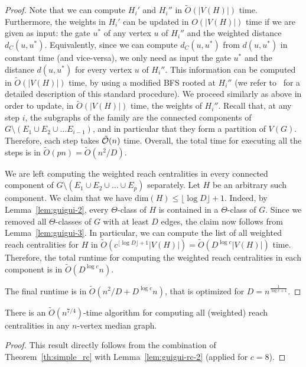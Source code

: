 \begin{proof}
Note that we can compute $H_i'$ and $H_i''$ in $\tilde{O}(|V(H)|)$ time.
Furthermore, the weights in $H_i'$ can be updated in $O(|V(H)|)$ time if we are given as input: the gate $u^*$ of any vertex $u$ of $H_i''$ and the weighted distance $d_C(u,u^*)$. 
Equivalently, since we can compute $d_C(u,u^*)$ from $d(u,u^*)$ in constant time (and vice-versa), we only need as input the gate $u^*$ and the distance $d(u,u^*)$ for every vertex $u$ of $H_i''$.
This information can be computed in $\tilde{O}(|V(H)|)$ time, by using a modified BFS rooted at $H_i''$ (we refer to~\cite[Lemma 17]{ChLaRa19} for a detailed description of this standard procedure).
We proceed similarly as above in order to update, in $\tilde{O}(|V(H)|)$ time, the weights of $H_i''$.
Recall that, at any step $i$, the subgraphs of the family are the connected components of $G \setminus (E_1 \cup E_2 \cup \ldots E_{i-1})$, and in particular that they form a partition of $V(G)$.
Therefore, each step takes $\tilde{\cal O}(n)$ time.
Overall, the total time for executing all the steps is in $\tilde{O}(pn) = \tilde{O}(n^2/D)$.

We are left computing the weighted reach centralities in every connected component of $G \setminus (E_1 \cup E_2 \cup \ldots \cup E_p)$ separately.
Let $H$ be an arbitrary such component.
We claim that we have $\mbox{dim}(H) \leq \lfloor \log{D} \rfloor + 1$.
Indeed, by Lemma~\ref{lem:guigui-2}, every $\Theta$-class of $H$ is contained in a $\Theta$-class of $G$.
Since we removed all $\Theta$-classes of $G$ with at least $D$ edges, the claim now follows from Lemma~\ref{lem:guigui-3}.
In particular, we can compute the list of all weighted reach centralities for $H$ in $\tilde{O}(c^{\lfloor \log{D} \rfloor + 1}|V(H)|) = \tilde{O}(D^{\log{c}}|V(H)|)$ time.
Therefore, the total runtime for computing the weighted reach centralities in each component is in $\tilde{O}(D^{\log{c}}n)$.

The final runtime is in $\tilde{O}(n^2/D + D^{\log{c}}n)$, that is optimized for $D = n^{\frac 1 {\log{c}+1}}$.
\end{proof}

\begin{theorem}\label{thm:guigui-rc-3}
There is an $\tilde{O}(n^{7/4})$-time algorithm for computing all (weighted) reach centralities in any $n$-vertex median graph.
\end{theorem}
\begin{proof}
This result directly follows from the combination of Theorem~\ref{th:simple_rc} with Lemma~\ref{lem:guigui-rc-2} (applied for $c = 8$).
\end{proof}